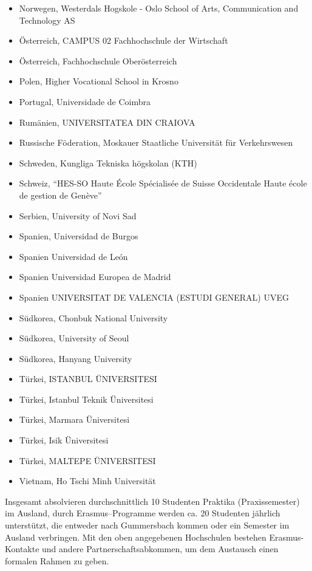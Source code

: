 \begin{itemize}
\item
  Norwegen, Westerdals Hogskole - Oslo School of Arts, Communication and
  Technology AS
\item
  Österreich, CAMPUS 02 Fachhochschule der Wirtschaft
\item
  Österreich, Fachhochschule Oberösterreich
\item
  Polen, Higher Vocational School in Krosno
\item
  Portugal, Universidade de Coimbra
\item
  Rumänien, UNIVERSITATEA DIN CRAIOVA
\item
  Russische Föderation, Moskauer Staatliche Universität für
  Verkehrswesen\\
\item
  Schweden, Kungliga Tekniska högskolan (KTH)
\item
  Schweiz, ``HES-SO Haute École Spécialisée de Suisse Occidentale Haute
  école de gestion de Genève''
\item
  Serbien, University of Novi Sad\\
\item
  Spanien, Universidad de Burgos
\item
  Spanien Universidad de León
\item
  Spanien Universidad Europea de Madrid
\item
  Spanien UNIVERSITAT DE VALENCIA (ESTUDI GENERAL) UVEG
\item
  Südkorea, Chonbuk National University\\
\item
  Südkorea, University of Seoul\\
\item
  Südkorea, Hanyang University\\
\item
  Türkei, ISTANBUL ÜNIVERSITESI\\
\item
  Türkei, Istanbul Teknik Üniversitesi\\
\item
  Türkei, Marmara Üniversitesi
\item
  Türkei, Isik Üniversitesi
\item
  Türkei, MALTEPE ÜNIVERSITESI
\item
  Vietnam, Ho Tschi Minh Universität
\end{itemize}

Insgesamt absolvieren durchschnittlich 10 Studenten Praktika
(Praxissemester) im Ausland, durch Erasmus--Programme werden ca. 20
Studenten jährlich unterstützt, die entweder nach Gummersbach kommen
oder ein Semester im Ausland verbringen. Mit den oben angegebenen
Hochschulen bestehen Erasmus-Kontakte und andere Partnerschaftsabkommen,
um dem Austausch einen formalen Rahmen zu geben.

